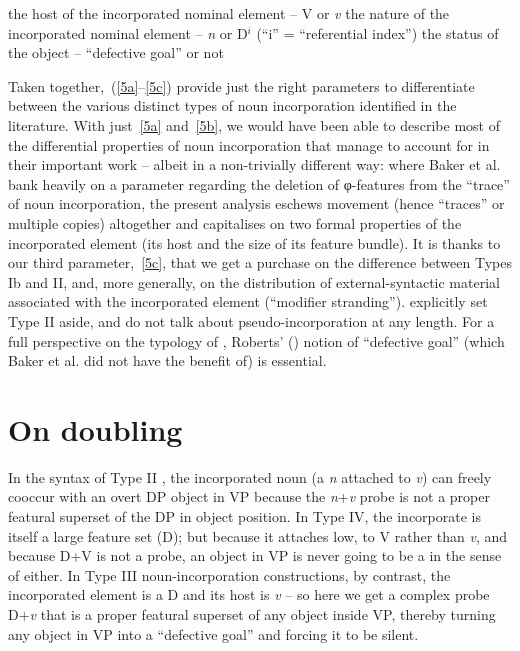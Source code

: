 \documentclass[output=paper]{langsci/langscibook}
\begin{document}
\begin{refcontext}
\begin{exe}
    \begin{xlist}
    \ex  the host of the incorporated nominal element -- V or \emph{v}
    \ex  the nature of the incorporated nominal element -- \emph{n} or D$^i$ (\enquote{i} = \enquote{referential index})
    \ex  the status of the object -- \enquote{defective goal} or not
    \end{xlist}
\end{exe}
Taken together,~(\ref{5a}--\ref{5c}) provide just the right parameters to
differentiate between the various distinct types of noun incorporation
identified in the literature. With just~\eqref{5a} and~\eqref{5b}, we would have
been able to describe most of the differential properties of noun incorporation
that \citet{bakeretal05}  manage to account for in their important work --
albeit in a non-trivially different way: where Baker et al. bank heavily on a
parameter regarding the deletion of φ{}-features from the \enquote{trace} of noun
incorporation, the present analysis eschews movement (hence \enquote{traces} or
multiple copies) altogether and capitalises on two formal properties of the
incorporated element (its host and the size of its feature bundle). It is
thanks to our third parameter,~\eqref{5c}, that we get a purchase on the
difference between Types Ib and II, and, more generally, on the
distribution of external-syntactic material associated with the incorporated
element (\enquote{modifier stranding}). \citet{bakeretal05} explicitly set Type II
aside, and do not talk about pseudo-incorporation at any length. For a full
perspective on the typology of , Roberts’
(\citeyear{Roberts2010}) notion of \enquote{defective goal} (which Baker et al. did
not have the benefit of) is essential.




\section{On doubling}
\label{sec:16.3}

In the syntax of Type II , the incorporated noun (a \emph{n}
attached to \emph{v}) can freely cooccur with an overt DP object in VP because
the \emph{n}+\emph{v} probe is not a proper featural superset of the DP in
object position. In Type IV, the incorporate is itself a large feature set (D);
but because it attaches low, to V rather than \emph{v}, and because D+V is not
a probe, an object in VP is never going to be a  in the sense of
\citet{Roberts2010} either. In Type III noun-incorporation constructions, by
contrast, the incorporated element is a D and its host is \emph{v} -- so here
we get a complex probe D+\emph{v} that is a proper featural superset of any
object inside VP, thereby turning any object in VP into a \enquote{defective
goal} and forcing it to be silent.


\end{refcontext}
\end{document}
